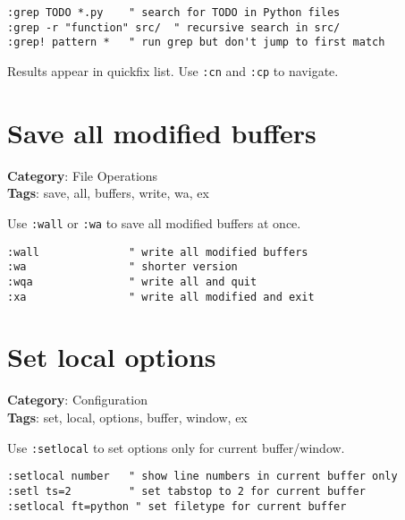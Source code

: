{{{{{\begin{Exa*}{}
\begin{Verbatim}[fontsize=\footnotesize, breaklines, breakanywhere]
:grep TODO *.py    " search for TODO in Python files
:grep -r "function" src/  " recursive search in src/
:grep! pattern *   " run grep but don't jump to first match
\end{Verbatim}
\end{Exa*}

Results appear in quickfix list. Use {\footnotesize \Verb§:cn§} and {\footnotesize \Verb§:cp§} to navigate.

\section{Save all modified buffers}

\textbf{Category}: File Operations\\ \textbf{Tags}: save, all, buffers, write, wa, ex
\vspace{0.5cm}

Use {\footnotesize \Verb§:wall§} or {\footnotesize \Verb§:wa§} to save all modified buffers at once.

\begin{Exa*}{}
\begin{Verbatim}[fontsize=\footnotesize, breaklines, breakanywhere]
:wall              " write all modified buffers
:wa                " shorter version
:wqa               " write all and quit
:xa                " write all modified and exit
\end{Verbatim}
\end{Exa*}

\section{Set local options}

\textbf{Category}: Configuration\\ \textbf{Tags}: set, local, options, buffer, window, ex
\vspace{0.5cm}

Use {\footnotesize \Verb§:setlocal§} to set options only for current buffer/window.

\begin{Exa*}{}
\begin{Verbatim}[fontsize=\footnotesize, breaklines, breakanywhere]
:setlocal number   " show line numbers in current buffer only
:setl ts=2         " set tabstop to 2 for current buffer
:setlocal ft=python " set filetype for current buffer
\end{Verbatim}
\end{Exa*}

}}}}}
